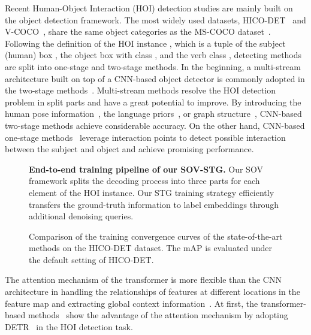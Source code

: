 \documentclass[10pt,twocolumn,letterpaper]{article}
\begin{document}
Recent Human-Object Interaction (HOI) detection studies are mainly built on the object detection framework.
The most widely used datasets, HICO-DET~\cite{chao2018learning} and V-COCO~\cite{gupta2015visual}, share the same object categories as the MS-COCO dataset~\cite{lin2014microsoft}.
Following the definition of the HOI instance , which is a tuple of the subject (human) box , the object box  with class , and the verb class , detecting methods are split into one-stage and two-stage methods. 
In the beginning, a multi-stream architecture built on top of a CNN-based object detector is commonly adopted in the two-stage methods~\cite{chao2018learning,gkioxari2018detecting,qi2018learning,gao2018ican}.
Multi-stream methods resolve the HOI detection problem in split parts and have a great potential to improve.
By introducing the human pose information~\cite{kim2020detecting,li2020detailed,zhong2021polysemy}, the language priors~\cite{gao2020drg,zhong2021polysemy}, or graph structure~\cite{gao2020drg,ulutan2020vsgnet,zhang2020spatio}, CNN-based two-stage methods achieve considerable accuracy.
On the other hand, CNN-based one-stage methods~\cite{liao2020ppdm,zhong2021glance,wang2020learning} leverage interaction points to detect possible interaction between the subject and object and achieve promising performance.
\begin{figure}[!t]
    \centering
    \caption{
        \textbf{End-to-end training pipeline of our SOV-STG.} Our SOV framework splits the decoding process into three parts for each element of the HOI instance.
        Our STG training strategy efficiently transfers the ground-truth information to label embeddings through additional denoising queries.
    }
    \label{fig:SOV_STG_pipeline}
\end{figure}
\begin{figure}[!t]
    \centering
    \caption{
        Comparison of the training convergence curves of the state-of-the-art methods on the HICO-DET dataset.
        The mAP is evaluated under the default setting of HICO-DET.
    }
    \label{fig:ap_compare_sota}
\end{figure}
The attention mechanism of the transformer is more flexible than the CNN architecture in handling the relationships of features at different locations in the feature map and extracting global context information~\cite{dosovitskiy2021an}.
At first, the transformer-based methods~\cite{tamura2021qpic,zou2021end,chen2021reformulating,kim2021hotr} show the advantage of the attention mechanism by adopting DETR~\cite{carion2020end} in the HOI detection task.
\end{document}
